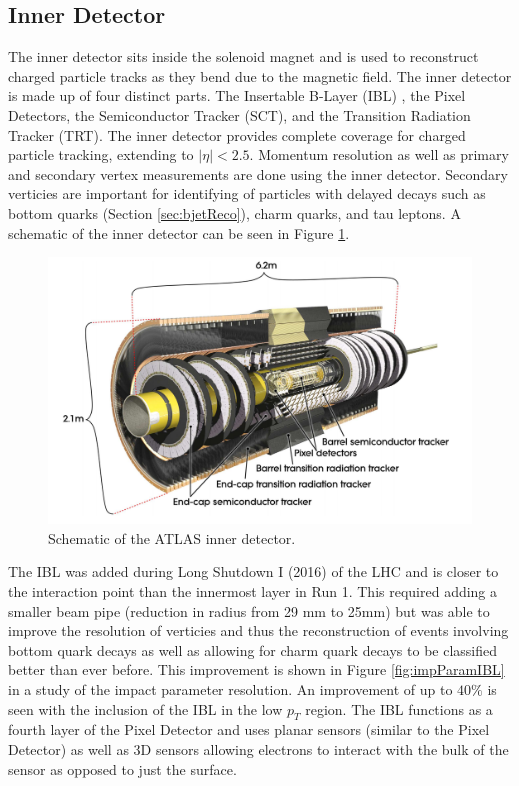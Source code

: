 \subsection{Inner Detector}
\label{sec:InnerDet}
The inner detector sits inside the solenoid magnet and is used to reconstruct charged particle tracks as they bend due to the magnetic field.  The inner detector is made up of four distinct parts.  The Insertable B-Layer (IBL) \cite{Capeans:1291633}, the Pixel Detectors, the Semiconductor Tracker (SCT), and the Transition Radiation Tracker (TRT)\cite{CERN-LHCC-97-016}.  The inner detector provides complete coverage for charged particle tracking, extending to $|\eta|<2.5$.  Momentum resolution as well as primary and secondary vertex measurements are done using the inner detector.  Secondary verticies are important for identifying of particles with delayed decays such as bottom quarks (Section \ref{sec:bjetReco}), charm quarks, and tau leptons. A schematic of the inner detector can be seen in Figure \ref{fig:ATLASInnerDet}.

\begin{figure}[h!]
	\centering
	\includegraphics[width=0.8\columnwidth]{../ThesisImages/LHCImages/ATLASInnerDetector.png}
	\caption[Schematic of the ATLAS inner detector.]{Schematic of the ATLAS inner detector.\cite{ATLAS}
	}
	\label{fig:ATLASInnerDet}
\end{figure}

The IBL was added during Long Shutdown I (2016) of the LHC and is closer to the interaction point than the innermost layer in Run 1.  This required adding a smaller beam pipe (reduction in radius from 29 mm to 25mm) but was able to improve the resolution of verticies and thus the reconstruction of events involving bottom quark decays as well as allowing for charm quark decays to be classified better than ever before.  This improvement is shown in Figure \ref{fig:impParamIBL} in a study of the impact parameter resolution.  An improvement of up to $40\%$ is seen with the inclusion of the IBL in the low $p_T$ region.  The IBL functions as a fourth layer of the Pixel Detector and uses planar sensors (similar to the Pixel Detector) as well as 3D sensors allowing electrons to interact with the bulk of the sensor as opposed to just the surface. 

